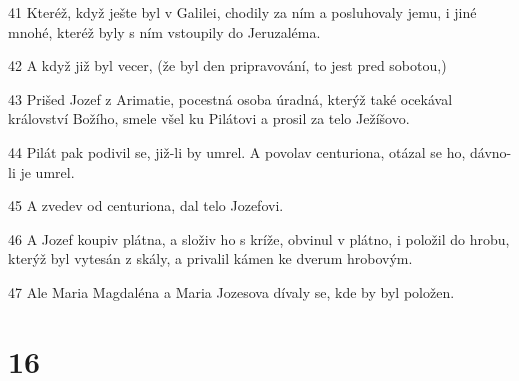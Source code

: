 \par 41 Kteréž, když ješte byl v Galilei, chodily za ním a posluhovaly jemu, i jiné mnohé, kteréž byly s ním vstoupily do Jeruzaléma.
\par 42 A když již byl vecer, (že byl den pripravování, to jest pred sobotou,)
\par 43 Prišed Jozef z Arimatie, pocestná osoba úradná, kterýž také ocekával království Božího, smele všel ku Pilátovi a prosil za telo Ježíšovo.
\par 44 Pilát pak podivil se, již-li by umrel. A povolav centuriona, otázal se ho, dávno-li je umrel.
\par 45 A zvedev od centuriona, dal telo Jozefovi.
\par 46 A Jozef koupiv plátna, a složiv ho s kríže, obvinul v plátno, i položil do hrobu, kterýž byl vytesán z skály, a privalil kámen ke dverum hrobovým.
\par 47 Ale Maria Magdaléna a Maria Jozesova dívaly se, kde by byl položen.

\chapter{16}


